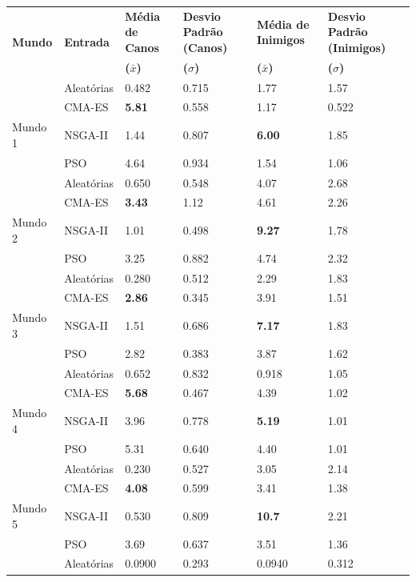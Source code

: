 \begin{table}[h]
    \centering
    \begin{tabular}{|p{2cm}|p{3cm}|p{2cm}|p{2cm}|p{2cm}|p{2cm}|}
        \hline
        \multirow{2}{*}{\textbf{Mundo}} & \multirow{2}{*}{\textbf{Entrada}} & \textbf{Média de Canos} & \textbf{Desvio Padrão (Canos)} & \textbf{Média de Inimigos} & \textbf{Desvio Padrão (Inimigos)} \\
         & & \textbf{($\bar{x}$)} & \textbf{($\sigma$)} & \textbf{($\bar{x}$)} & \textbf{($\sigma$)} \\
        \hline
        & Aleatórias & 0.482 & 0.715 & 1.77 & 1.57 \\
	    & CMA-ES & \textbf{5.81} & 0.558 & 1.17 & 0.522 \\
	    Mundo 1 & NSGA-II & 1.44 & 0.807 & \textbf{6.00} & 1.85 \\
        & PSO & 4.64 & 0.934 & 1.54 & 1.06 \\
        \hline
        &  Aleatórias & 0.650 & 0.548 & 4.07 & 2.68 \\
	&  CMA-ES & \textbf{3.43} & 1.12 & 4.61 & 2.26 \\
	Mundo 2 &  NSGA-II & 1.01 & 0.498 & \textbf{9.27} & 1.78 \\
        &  PSO & 3.25 & 0.882 & 4.74 & 2.32 \\
        \hline
        & Aleatórias & 0.280 & 0.512 & 2.29 & 1.83 \\
	& CMA-ES & \textbf{2.86} & 0.345 & 3.91 & 1.51 \\
	Mundo 3 & NSGA-II & 1.51 & 0.686 & \textbf{7.17} & 1.83 \\
        & PSO & 2.82 & 0.383 & 3.87 & 1.62 \\
        \hline
        & Aleatórias & 0.652 & 0.832 & 0.918 & 1.05 \\
	& CMA-ES & \textbf{5.68} & 0.467 & 4.39 & 1.02 \\
	Mundo 4 & NSGA-II & 3.96 & 0.778 & \textbf{5.19} & 1.01 \\
        & PSO & 5.31 & 0.640 & 4.40 & 1.01 \\
        \hline
        & Aleatórias & 0.230 & 0.527 & 3.05 & 2.14 \\
	&  CMA-ES & \textbf{4.08} & 0.599 & 3.41 & 1.38 \\
	Mundo 5 & NSGA-II & 0.530 & 0.809 & \textbf{10.7} & 2.21 \\
        &  PSO & 3.69 & 0.637 & 3.51 & 1.36 \\
        \hline
        & Aleatórias & 0.0900 & 0.293 & 0.0940 & 0.312 \\

\end{tabular}
\end{table}
